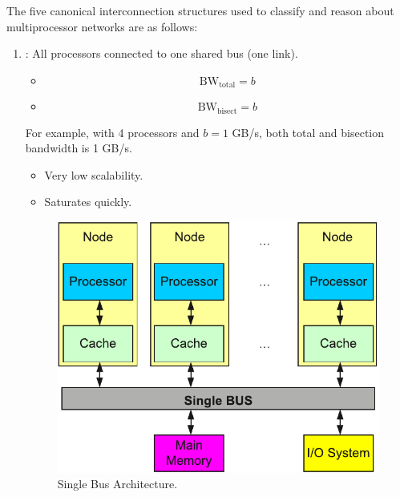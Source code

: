 \highspace
The five canonical interconnection structures used to classify and reason about multiprocessor networks are as follows:
\begin{enumerate}
    \item {}: All processors connected to one shared bus (one link).
    \begin{itemize}
        \item {}
        \begin{equation}
            \text{BW}_{\text{total}} = b
        \end{equation}
        \item {}
        \begin{equation}
            \text{BW}_{\text{bisect}} = b
        \end{equation}
    \end{itemize}
    For example, with 4 processors and $b = 1$ GB/s, both total and bisection bandwidth is 1 GB/s.
    \begin{itemize}
        \item[\textcolor{Red2}{\faIcon{times}}] Very low scalability.
        \item[\textcolor{Red2}{\faIcon{times}}] Saturates quickly.
    \end{itemize}
    \begin{figure}[!htp]
        \centering
        \includegraphics[width=.6\textwidth]{img/single-bus.pdf}
        \caption{Single Bus Architecture.\cite{course-slides-polimi}}
    \end{figure}

    \newpage


\end{enumerate}
